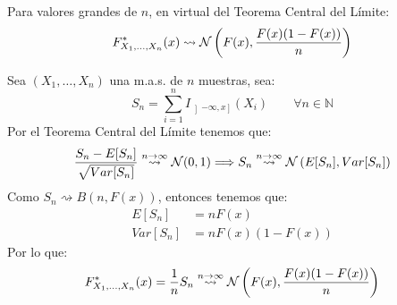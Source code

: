 \begin{ejercicio}
    Para valores grandes de $n$, en virtual del Teorema Central del Límite:
    \begin{equation*}
        F_{X_1, \ldots, X_n}^\ast (x) \rightsquigarrow \mathcal{N}\left(F(x), \dfrac{F(x)(1-F(x))}{n}\right)
    \end{equation*}

    \noindent
    Sea $(X_1, \ldots, X_n)$ una m.a.s. de $n$ muestras, sea:
    \begin{equation*}
        S_n = \sum\limits_{i=1}^{n} I_{\left]-\infty,x\right]}(X_i) \qquad \forall n\in \mathbb{N}
    \end{equation*}
    Por el Teorema Central del Límite tenemos que:
    \begin{equation*}
        \dfrac{S_n - E[S_n]}{\sqrt{Var[S_n]}} \stackrel{n\to \infty}{\rightsquigarrow} \mathcal{N}(0,1) \Longrightarrow S_n \stackrel{n\to \infty}{\rightsquigarrow} \mathcal{N}\left(E[S_n], Var[S_n]\right)
    \end{equation*}
    Como $S_n \rightsquigarrow B(n,F(x))$, entonces tenemos que:
    \begin{align*}
        E[S_n] &= nF(x) \\
        Var[S_n] &= nF(x)(1-F(x))
    \end{align*}
    Por lo que:
    \begin{equation*}
        F_{X_1, \ldots, X_n}^\ast (x) = \dfrac{1}{n}S_n \stackrel{n\to \infty}{\rightsquigarrow} \mathcal{N}\left(F(x), \dfrac{F(x)(1-F(x))}{n}\right)
    \end{equation*}
\end{ejercicio}

